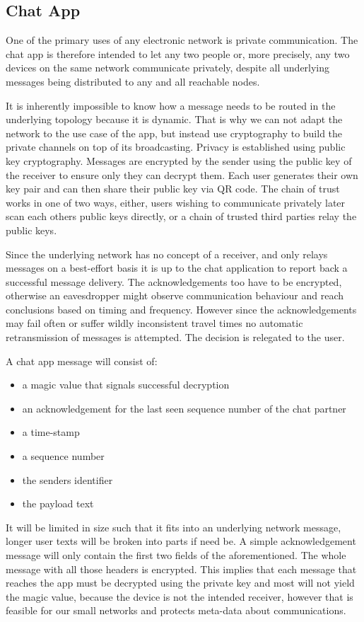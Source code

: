 \subsection{Chat App}
One of the primary uses of any electronic network is private communication. The chat app is therefore intended to let any two people or, more precisely, any two devices on the same network communicate privately, despite all underlying messages being distributed to any and all reachable nodes.

It is inherently impossible to know how a message needs to be routed in the underlying topology because it is dynamic. That is why we can not adapt the network to the use case of the app, but instead use cryptography to build the private channels on top of its broadcasting. Privacy is established using public key cryptography. Messages are encrypted by the sender using the public key of the receiver to ensure only they can decrypt them. Each user generates their own key pair and can then share their public key via QR code. The chain of trust works in one of two ways, either, users wishing to communicate privately later scan each others public keys directly, or a chain of trusted third parties relay the public keys.

Since the underlying network has no concept of a receiver, and only relays messages on a best-effort basis it is up to the chat application to report back a successful message delivery. The acknowledgements too have to be encrypted, otherwise an eavesdropper might observe communication behaviour and reach conclusions based on timing and frequency. However since the acknowledgements may fail often or suffer wildly inconsistent travel times no automatic retransmission of messages is attempted. The decision is relegated to the user.

A chat app message will consist of:\begin{itemize}
	\item {a magic value that signals successful decryption}
	\item {an acknowledgement for the last seen sequence number of the chat partner}
	\item {a time-stamp}
	\item {a sequence number}
	\item {the senders identifier}
	\item {the payload text}
\end{itemize}
It will be limited in size such that it fits into an underlying network message, longer user texts will be broken into parts if need be. A simple acknowledgement message will only contain the first two fields of the aforementioned. The whole message with all those headers is encrypted. This implies that each message that reaches the app must be decrypted using the private key and most will not yield the magic value, because the device is not the intended receiver, however that is feasible for our small networks and protects meta-data about communications.

